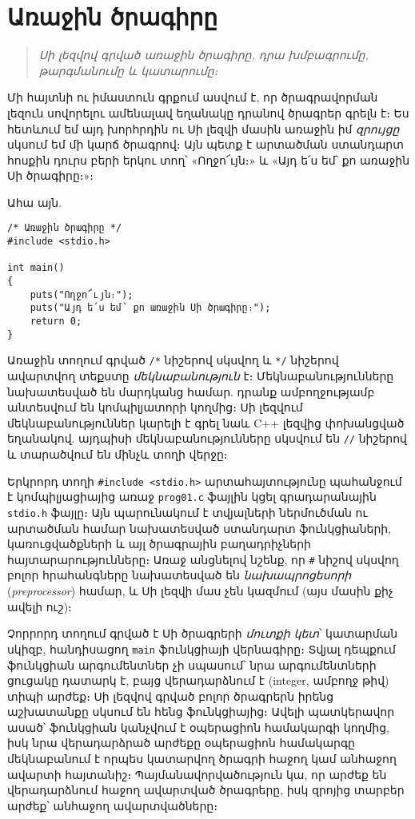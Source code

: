 \chapter{Առաջին ծրագիրը}

\begin{quote}
\emph{Սի լեզվով գրված առաջին ծրագիրը, դրա խմբագրումը,
թարգմանումը և կատարումը։}
\end{quote}

Մի հայտնի ու իմաստուն գրքում \cite{krc} ասվում է, որ ծրագրավորման
լեզուն սովորելու ամենալավ եղանակը դրանով ծրագրեր գրելն է։ Ես հետևում
եմ այդ խորհրդին ու Սի լեզվի մասին առաջին իմ \emph{զրույցը} սկսում
եմ մի կարճ ծրագրով։ Այն պետք է արտածման ստանդարտ հոսքին դուրս բերի
երկու տող՝ «Ողջո՜ւյն։» և «Այդ ե՛ս եմ՝ քո առաջին Սի ծրագիրը։»։

Ահա այն.

\begin{Verbatim}
/* Առաջին ծրագիրը */
#include <stdio.h>

int main()
{
    puts("Ողջո՜ւյն։");
    puts("Այդ ե՛ս եմ՝ քո առաջին Սի ծրագիրը։");
    return 0;
}
\end{Verbatim}

Առաջին տողում գրված \Verb|/*| նիշերով սկսվող և \Verb|*/| նիշերով
ավարտվող տեքստը \emph{մեկնաբանություն} է։ Մեկնաբանությունները
նախատեսված են մարդկանց հա\-մար. դրանք ամբողջությամբ անտեսվում են
կոմպիլյատորի կողմից։ Սի լեզվում մեկնաբանություններ կարելի է գրել
նաև C++ լեզվից փոխանցված եղանակով. այդպիսի մեկնաբանությունները
սկսվում են \Verb|//| նիշերով և տարածվում են մինչև տողի վերջը։

Երկրորդ տողի \Verb|#include <stdio.h>| արտահայտությունը պահանջում
է կոմ\-պիլյացիայից առաջ \texttt{prog01.c} ֆայլին կցել գրադարանային
\texttt{stdio.h} ֆայլը։ Այն պարունակում է տվյալների ներմուծման ու
արտածման համար նախատես\-ված ստանդարտ ֆունկցիաների, կառուցվածքների և
այլ ծրագրային բաղադրիչների հայտարարությունները։ Առաջ անցնելով
նշենք, որ \Verb|#| նիշով սկսվող բոլոր հրահանգները նախատեսված են
\emph{նախապրոցեսորի} (\emph{preprocessor}) համար, և Սի լեզվի մաս
չեն կազմում (այս մասին քիչ ավելի ուշ)։

Չորրորդ տողում գրված է Սի ծրագրերի \emph{մուտքի կետ}՝ կատարման
սկիզբ, հանդիսացող \texttt{main} ֆունկցիայի վերնագիրը։ Տվյալ
դեպքում  ֆունկցիան արգումենտներ չի սպասում՝ նրա
արգումենտների ցուցակը դատարկ է, բայց վերադարձնում է 
(integer, ամբողջ թիվ) տիպի արժեք։ Սի լեզվով գրված բոլոր ծրագրերն
իրենց աշխատանքը սկսում են հենց  ֆունկցիայից։ Ավելի
պատկերավոր ասած՝  ֆունկցիան կանչվում է օպերացիոն
համակարգի կողմից, իսկ նրա վերադարձրած արժեքը օպերացիոն համակարգը
մեկնաբանում է որպես կատարվող ծրագրի հաջող կամ անհաջող ավարտի
հայտանիշ։ Պայ\-մանավորվածություն կա, որ  արժեք են
վերադարձնում հաջող ավարտված ծրագրերը, իսկ զրոյից տարբեր արժեք՝
անհաջող ավարտվածները։

